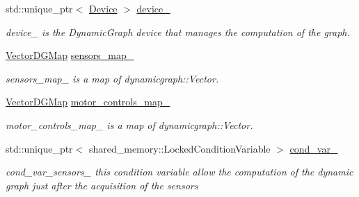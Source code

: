 \begin{DoxyCompactItemize}
\mbox{\label{classdynamic__graph_1_1DynamicGraphManager_a416ca1c33660df4f7f74eb29df4c5a58}} 
std\+::unique\+\_\+ptr$<$ \hyperlink{classdynamic__graph_1_1Device}{Device} $>$ \hyperlink{classdynamic__graph_1_1DynamicGraphManager_a416ca1c33660df4f7f74eb29df4c5a58}{device\+\_\+}
\begin{DoxyCompactList}\small\item\em device\+\_\+ is the Dynamic\+Graph device that manages the computation of the graph. \end{DoxyCompactList}\item 
\hyperlink{namespacedynamic__graph_a51212ed7fa4ae81e7b362a27f09b7ab8}{Vector\+D\+G\+Map} \hyperlink{classdynamic__graph_1_1DynamicGraphManager_a896bf6cb22d2d88a5a6a307a2e44608e}{sensors\+\_\+map\+\_\+}
\begin{DoxyCompactList}\small\item\em sensors\+\_\+map\+\_\+ is a map of dynamicgraph\+::\+Vector. \end{DoxyCompactList}\item 
\hyperlink{namespacedynamic__graph_a51212ed7fa4ae81e7b362a27f09b7ab8}{Vector\+D\+G\+Map} \hyperlink{classdynamic__graph_1_1DynamicGraphManager_a03eabd2f08990a1dcc1caa652b701020}{motor\+\_\+controls\+\_\+map\+\_\+}
\begin{DoxyCompactList}\small\item\em motor\+\_\+controls\+\_\+map\+\_\+ is a map of dynamicgraph\+::\+Vector. \end{DoxyCompactList}\item 
\mbox{\label{classdynamic__graph_1_1DynamicGraphManager_a003d8598839c07a7d81c1afed0ea0b01}} 
std\+::unique\+\_\+ptr$<$ shared\+\_\+memory\+::\+Locked\+Condition\+Variable $>$ \hyperlink{classdynamic__graph_1_1DynamicGraphManager_a003d8598839c07a7d81c1afed0ea0b01}{cond\+\_\+var\+\_\+}
\begin{DoxyCompactList}\small\item\em cond\+\_\+var\+\_\+sensors\+\_\+ this condition variable allow the computation of the dynamic graph just after the acquisition of the sensors \end{DoxyCompactList}\item 
\mbox{\label{classdynamic__graph_1_1DynamicGraphManager_a7e6cc5e58f1accce947f929d233a67fd}} 

\end{DoxyCompactItemize}
